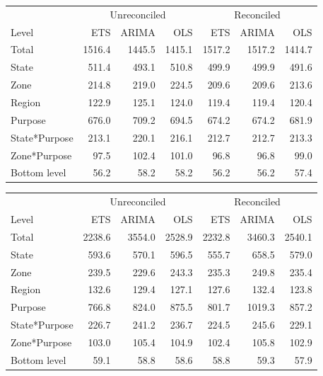 \documentclass[11pt,a4paper,]{article}
\let\origtable\table
\let\endorigtable\endtable
\renewenvironment{table}[1][2] {
    \expandafter\origtable\expandafter[!htbp]
} {
    \endorigtable
}
\begin{document}
\begin{table}[!h]

\caption{\label{tab:Tourismdataresulrolling}Mean(RMSE) on 2 year test set for ETS, ARIMA and OLS with and without reconciliation - Rolling origin - Tourism dataset}
\centering
\begin{tabular}{lrrrrrr}
\toprule
\multicolumn{1}{c}{} & \multicolumn{3}{c}{Unreconciled} & \multicolumn{3}{c}{Reconciled} \\
\cmidrule(l{2pt}r{2pt}){2-4} \cmidrule(l{2pt}r{2pt}){5-7}
Level & ETS & ARIMA & OLS & ETS & ARIMA & OLS\\
\midrule
Total & 1516.4 & 1445.5 & 1415.1 & 1517.2 & 1517.2 & 1414.7\\
State & 511.4 & 493.1 & 510.8 & 499.9 & 499.9 & 491.6\\
Zone & 214.8 & 219.0 & 224.5 & 209.6 & 209.6 & 213.6\\
Region & 122.9 & 125.1 & 124.0 & 119.4 & 119.4 & 120.4\\
Purpose & 676.0 & 709.2 & 694.5 & 674.2 & 674.2 & 681.9\\
State*Purpose & 213.1 & 220.1 & 216.1 & 212.7 & 212.7 & 213.3\\
Zone*Purpose & 97.5 & 102.4 & 101.0 & 96.8 & 96.8 & 99.0\\
Bottom level & 56.2 & 58.2 & 58.2 & 56.2 & 56.2 & 57.4\\
\bottomrule
\end{tabular}
\end{table}

\begin{table}[t]

\caption{\label{tab:TourismdataresultRMSE}Mean(RMSE) on 2 year test set for ETS, ARIMA and OLS with and without reconciliation - Fixed origin - Tourism dataset}
\centering
\begin{tabular}{lrrrrrr}
\toprule
\multicolumn{1}{c}{} & \multicolumn{3}{c}{Unreconciled} & \multicolumn{3}{c}{Reconciled} \\
\cmidrule(l{2pt}r{2pt}){2-4} \cmidrule(l{2pt}r{2pt}){5-7}
Level & ETS & ARIMA & OLS & ETS & ARIMA & OLS\\
\midrule
Total & 2238.6 & 3554.0 & 2528.9 & 2232.8 & 3460.3 & 2540.1\\
State & 593.6 & 570.1 & 596.5 & 555.7 & 658.5 & 579.0\\
Zone & 239.5 & 229.6 & 243.3 & 235.3 & 249.8 & 235.4\\
Region & 132.6 & 129.4 & 127.1 & 127.6 & 132.4 & 123.8\\
Purpose & 766.8 & 824.0 & 875.5 & 801.7 & 1019.3 & 857.2\\
State*Purpose & 226.7 & 241.2 & 236.7 & 224.5 & 245.6 & 229.1\\
Zone*Purpose & 103.0 & 105.4 & 104.9 & 102.4 & 105.8 & 102.9\\
Bottom level & 59.1 & 58.8 & 58.6 & 58.8 & 59.3 & 57.9\\
\bottomrule
\end{tabular}
\end{table}
\end{document}
